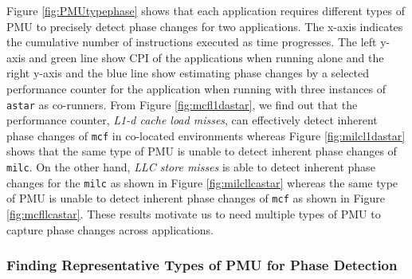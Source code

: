 \documentclass{sig-alternate}
\begin{document}
Figure \ref{fig:PMUtypephase} shows that each application requires different types of PMU to precisely detect phase changes for two applications. The x-axis indicates the cumulative number of instructions executed as time progresses. The left y-axis and green line show CPI of the applications when running alone and the right y-axis and the blue line show estimating phase changes by a selected performance counter for the application when running with three instances of \texttt{astar} as co-runners. From Figure \ref{fig:mcfl1dastar}, we find out that the performance counter, \textit{L1-d cache load misses}, can effectively detect inherent phase changes of \texttt{mcf} in co-located environments whereas Figure \ref{fig:milcl1dastar} shows that the same type of PMU is unable to detect inherent phase changes of \texttt{milc}. On the other hand, \textit{LLC store misses} is able to detect inherent phase changes for the \texttt{milc} as shown in Figure \ref{fig:milcllcastar} whereas the same type of PMU is unable to detect inherent phase changes of \texttt{mcf} as shown in Figure \ref{fig:mcfllcastar}. These results motivate us to need multiple types of PMU to capture phase changes across applications.
\subsubsection{Finding Representative Types of PMU for Phase Detection}
\label{subsubsec:FindingRepresentativeTypesofPMUforPhaseDetection}
\end{document}
